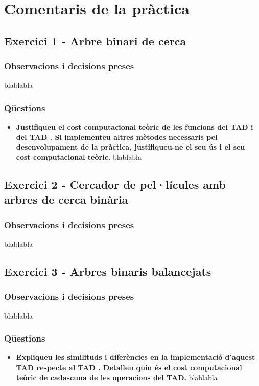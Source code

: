 \chapter{Comentaris de la pràctica}

\section{Exercici 1 - Arbre binari de cerca}
\subsection{Observacions i decisions preses}
blablabla
\subsection{Qüestions}
\begin{itemize}
	\item \textbf{Justifiqueu el cost computacional teòric de les funcions del TAD  i del TAD . Si implementeu altres mètodes necessaris pel desenvolupament de la pràctica, justifiqueu-ne el seu ús i el seu cost computacional teòric.}
	\newline
	blablabla
\end{itemize}

\section{Exercici 2 - Cercador de pel·lícules amb arbres de cerca binària}
\subsection{Observacions i decisions preses}
blablabla

\section{Exercici 3 - Arbres binaris balancejats}
\subsection{Observacions i decisions preses}
blablabla
\subsection{Qüestions}
\begin{itemize}
	\item \textbf{Expliqueu les similituds i diferències en la implementació d’aquest TAD  respecte al TAD . Detalleu quin és el cost computacional teòric de cadascuna de les operacions del TAD.}
	\newline
	blablabla
\end{itemize}

